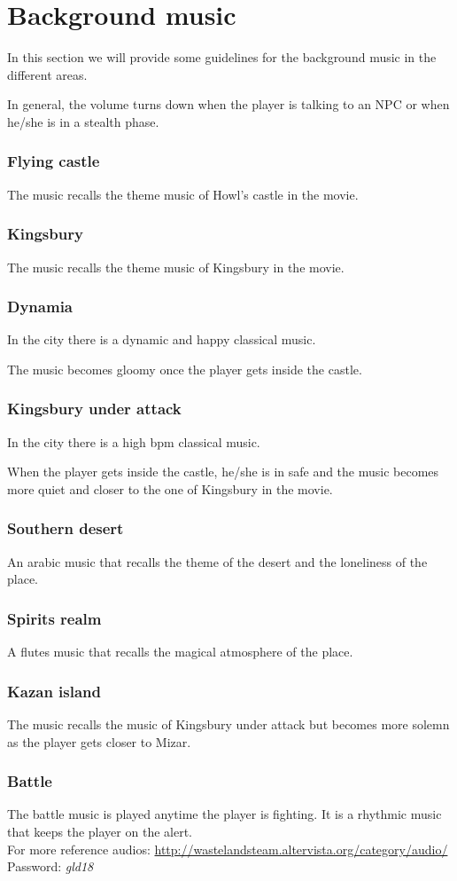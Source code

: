 \section{Background music}
In this section we will provide some guidelines for the background music in the different areas.

In general, the volume turns down when the player is talking to an NPC or when he/she is in a stealth phase.

\subsubsection{Flying castle}
The music recalls the theme music of Howl's castle in the movie.

\subsubsection{Kingsbury}
The music recalls the theme music of Kingsbury in the movie.

\subsubsection{Dynamia}
In the city there is a dynamic and happy classical music.

The music becomes gloomy once the player gets inside the castle.

\subsubsection{Kingsbury under attack}
In the city there is a high bpm classical music.

When the player gets inside the castle, he/she is in safe and the music becomes more quiet and closer to the one of Kingsbury in the movie.

\subsubsection{Southern desert}
An arabic music that recalls the theme of the desert and the loneliness of the place.

\subsubsection{Spirits realm}
A flutes music that recalls the magical atmosphere of the place.

\subsubsection{Kazan island}
The music recalls the music of Kingsbury under attack but becomes more solemn as the player gets closer to Mizar.

\subsubsection{Battle}
The battle music is played anytime the player is fighting. It is a rhythmic music that keeps the player on the alert. \\

For more reference audios: \url{http://wastelandsteam.altervista.org/category/audio/}\\
Password: \textit{gld18}
